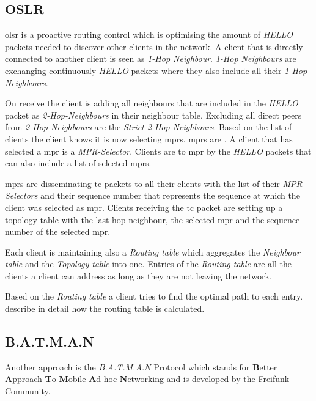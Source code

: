 \subsection{OSLR}\label{sec:mesh-oslr}
\gls{olsr} is a proactive routing control which is optimising the amount of \textit{HELLO} packets needed to discover other clients in the network.
A client that is directly connected to another client is seen as \textit{1-Hop Neighbour}. \textit{1-Hop Neighbours} are exchanging continuously \textit{HELLO} packets where they also include all their \textit{1-Hop Neighbours}.

On receive the client is adding all neighbours that are included in the \textit{HELLO} packet as \textit{2-Hop-Neighbours} in their neighbour table. Excluding all direct peers from \textit{2-Hop-Neighbours} are the \textit{Strict-2-Hop-Neighbours}.
Based on the list of clients the client knows it is now selecting \glspl{mpr}. \Glspl{mpr} are \cite[\S1.4]{rfc-oslr}. A client that has selected a \gls{mpr} is a \textit{MPR-Selector}. Clients are  to \gls{mpr} by the \textit{HELLO} packets that can also include a list of selected \glspl{mpr}.

\Glspl{mpr} are disseminating \gls{tc} packets to all their clients with the list of their \textit{MPR-Selectors} and their sequence number that represents the sequence at which the client was selected as \gls{mpr}.
Clients receiving the \gls{tc} packet are setting up a topology table with the last-hop neighbour, the selected \gls{mpr} and the sequence number of the selected \gls{mpr}.

Each client is maintaining also a \textit{Routing table} which aggregates the \textit{Neighbour table} and the \textit{Topology table} into one. Entries of the \textit{Routing table} are all the clients a client can address as long as they are not leaving the network. 

Based on the \textit{Routing table} a client tries to find the optimal path to each entry. \citet[\S4.4]{jacquet_muhlethaler_clausen_laouiti_qayyum_viennot} describe in detail how the routing table is calculated.

\subsection{B.A.T.M.A.N}\label{sec:batman}
Another approach is the \textit{B.A.T.M.A.N} Protocol which stands for \textbf{B}etter \textbf{A}pproach \textbf{T}o \textbf{M}obile \textbf{A}d hoc \textbf{N}etworking and is developed by the Freifunk Community.

